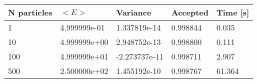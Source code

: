 \begin{table}[h!]
\begin{tabular}{|l|l|l|l|l|}
\hline 
N particles & $<E>$ & Variance & Accepted & Time [s]\\ 
 \hline 
1 & 4.999999e-01 & 1.337819e-14 & 0.998844 & 0.035 \\ \hline 
10 & 4.999999e+00 & 2.948752e-13 & 0.998800 & 0.111 \\ \hline 
100 & 4.999999e+01 & -2.273737e-11 & 0.998711 & 2.907 \\ \hline 
500 & 2.500000e+02 & 1.455192e-10 & 0.998767 & 61.364 \\ \hline 
\end{tabular}
\label{tab:in1} 
\end{table} 
